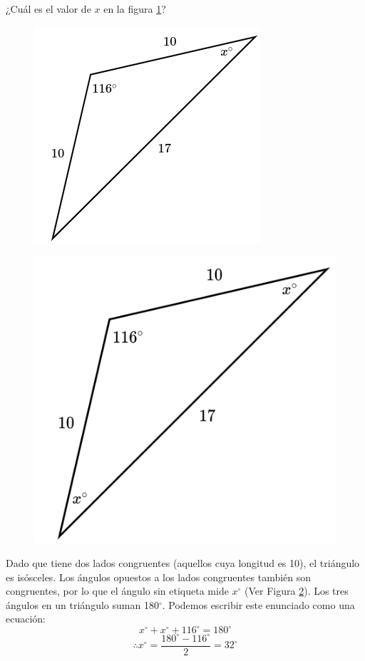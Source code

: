 ¿Cuál es el valor de $x$ en la figura \ref{fig:findangle14}?

\begin{minipage}[t][][t]{0.35\textwidth}
    \begin{figure}[H]
        \centering
        \includegraphics[width=0.65\linewidth]{../images/findangle14.png}
        \caption{}
        \label{fig:findangle14}
    \end{figure}
\end{minipage}\hfill
\begin{minipage}[t][][t]{0.65\textwidth}
    \begin{solutionbox}{5cm}\footnotesize
        \begin{figure}
            \centering
            \includegraphics[width=0.85\linewidth]{../images/findangle14a.png}
            \caption{}
            \label{fig:findangle14a}
        \end{figure}
        Dado que tiene dos lados congruentes (aquellos cuya longitud es 10), el triángulo es isósceles. Los ángulos opuestos a los lados congruentes también son congruentes, por lo que el ángulo sin etiqueta mide $x^\circ$ (Ver Figura \ref{fig:findangle14a}).
        Los tres ángulos en un triángulo suman 180$^\circ$. Podemos escribir este enunciado como una ecuación:
        \[x^\circ + x^\circ + 116^\circ = 180^\circ \]
        \[\therefore x^\circ = \dfrac{180^\circ - 116^\circ}{2}  = 32^\circ\]
    \end{solutionbox}
\end{minipage}